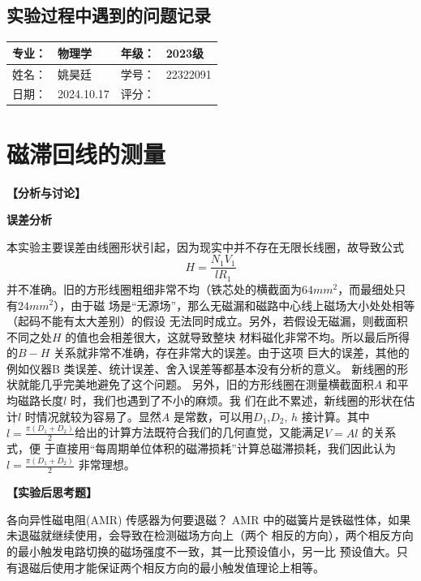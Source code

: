 \documentclass[dvipsnames, svgnames,a4paper,11pt]{article}
\begin{document}
\subsection{实验过程中遇到的问题记录}



\clearpage
{}
\begin{table}
	\renewcommand\arraystretch{1.7}
	\begin{tabularx}{\textwidth}{|X|X|X|X|}
	\hline
	专业：& 物理学 &年级：& 2023级\\
	\hline
	姓名： &姚昊廷 & 学号：& 22322091\\
	\hline
    日期：&2024.10.17 & 评分： &\\
	\hline
	\end{tabularx}
\end{table}

\section{磁滞回线的测量}

\textbf{【分析与讨论】}

{\begin{center}
	\textbf{误差分析}
\end{center}}

本实验主要误差由线圈形状引起，因为现实中并不存在无限长线圈，故导致公式
$$H=\frac{N_1V_1}{lR_1}$$
并不准确。旧的方形线圈粗细非常不均（铁芯处的横截面为$64mm^2$，而最细处只有$24mm^2$），由于磁
场是“无源场”，那么无磁漏和磁路中心线上磁场大小处处相等（起码不能有太大差别）的假设
无法同时成立。另外，若假设无磁漏，则截面积不同之处$H$ 的值也会相差很大，这就导致整块
材料磁化非常不均。所以最后所得的$B−H$ 关系就非常不准确，存在非常大的误差。由于这项
巨大的误差，其他的例如仪器B 类误差、统计误差、舍入误差等都基本没有分析的意义。
新线圈的形状就能几乎完美地避免了这个问题。
另外，旧的方形线圈在测量横截面积$A$ 和平均磁路长度$l$ 时，我们也遇到了不小的麻烦。我
们在此不累述，新线圈的形状在估计$l$ 时情况就较为容易了。显然$A$ 是常数，可以用$D_1$,$D_2$, $h$
接计算。其中$l=\frac{\pi(D_1+D_2)}{2}$给出的计算方法既符合我们的几何直觉，又能满足$V = Al$ 的关系式，便
于直接用“每周期单位体积的磁滞损耗”计算总磁滞损耗，我们因此认为$l=\frac{\pi(D_1+D_2)}{2}$ 非常理想。

\textbf{【实验后思考题】}
\begin{question}
	各向异性磁电阻(AMR) 传感器为何要退磁？
	\tcblower
	AMR 中的磁簧片是铁磁性体，如果未退磁就继续使用，会导致在检测磁场方向上（两个
相反的方向），两个相反方向的最小触发电路切换的磁场强度不一致，其一比预设值小，另一比
预设值大。只有退磁后使用才能保证两个相反方向的最小触发值理论上相等。
\end{question}
\end{document}
